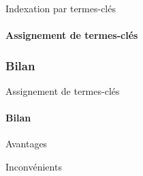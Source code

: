 \begin{frame}{Indexation par termes-clés}\framesubtitle{Assignement de termes-clés}
\end{frame}


\subsubsection{Bilan}
  \begin{frame}{Assignement de termes-clés}\framesubtitle{Bilan}
    \begin{block}{Avantages}
    \end{block}

    \begin{alertblock}{Inconvénients}
    \end{alertblock}
  \end{frame}

